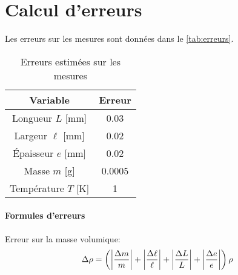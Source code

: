 \section{Calcul d'erreurs}
\label{sec:erreurs}

Les erreurs sur les mesures sont données dans le \autoref{tab:erreurs}.

\begin{table}[h]
    \centering
    \begin{tabulary}{\textwidth}{C C}
        \toprule
        Variable & Erreur \\
        \midrule
        Longueur \(L\) [\si{\milli\meter}] & 0.03 \\
        Largeur \(\ell\) [\si{\milli\meter}] & 0.02 \\
        Épaisseur \(e\) [\si{\milli\meter}] & 0.02 \\
        Masse \(m\) [\si{\gram}] & 0.0005 \\
        Température \(T\) [\si{\kelvin}] & 1 \\
        \bottomrule
    \end{tabulary}
    \caption{Erreurs estimées sur les mesures}
    \label{tab:erreurs}
\end{table}




\paragraph*{Formules d'erreurs}

Erreur sur la masse volumique:
\begin{equation}
    \Delta \rho = \left(\left|\frac{\Delta m}{m}\right| + \left|\frac{\Delta \ell}{\ell}\right| + \left|\frac{\Delta L}{L}\right| + \left|\frac{\Delta e}{e}\right|\right) \rho
\end{equation}

